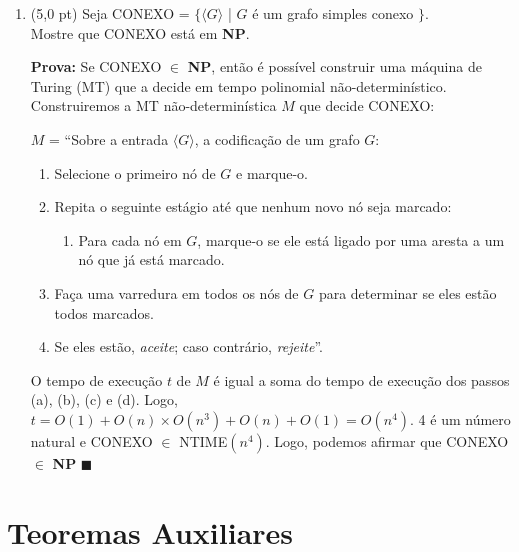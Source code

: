 \documentclass[12pt,a4paper,oneside]{article}
\begin{document}
\begin{enumerate}
	\item (5,0 pt) Seja CONEXO = $\{ \langle G \rangle$ | $G$ é um grafo simples conexo $\}$. \\Mostre que CONEXO está em {\bf NP}.
	
	\vspace*{0.5cm}
	
	{\color{blue}
		{\bf Prova:} Se CONEXO $\in$ {\bf NP}, então é possível construir uma máquina de Turing (MT) que a decide em tempo polinomial não-determinístico. Construiremos a MT não-determinística $M$ que decide CONEXO:
		
		$M$ = ``Sobre a entrada $\langle G \rangle$, a codificação de um grafo $G$:
		\begin{enumerate}
			\item Selecione o primeiro nó de $G$ e marque-o.
			\item Repita o seguinte estágio até que nenhum novo nó seja marcado:
			\begin{enumerate}
				\item Para cada nó em $G$, marque-o se ele está ligado por uma aresta a um nó que já está marcado.
			\end{enumerate}
			\item Faça uma varredura em todos os nós de $G$ para determinar se eles estão todos marcados. 
			\item Se eles estão, {\it aceite}; caso contrário, {\it rejeite}''.
		\end{enumerate}
		
		O tempo de execução $t$ de $M$ é igual a soma do tempo de execução dos passos (a), (b), (c) e (d). Logo, $t = O(1) + O(n)\times O(n^3) + O(n) + O(1)= O(n^4)$. 4 é um número natural e CONEXO $\in$ {\sc NTIME}$(n^4)$. Logo, podemos afirmar que CONEXO $\in$ {\bf NP} $\blacksquare$
	}

\end{enumerate}

\section*{Teoremas Auxiliares}
\end{document}

